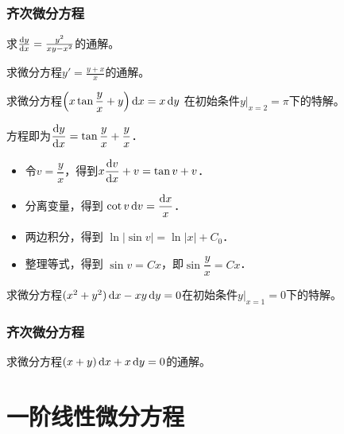 \documentclass[14pt,notheorems,leqno,xcolor={rgb}]{beamer} %
\begin{document}
\begin{frame}
\frametitle{齐次微分方程}
\begin{example}求$\frac{\mathop{}\!\mathrm{d}{y}}{\mathop{}\!\mathrm{d}{x}}=\frac{y^2}{xy-x^2}$的通解。
\end{example}
\pause
\begin{exercise}
求微分方程$y'=\frac{y+x}x$的通解。
\end{exercise}
\end{frame}

\begin{frame}%
\begin{example}求微分方程$\Big(x\tan\dfrac{y}{x}+y\Big)\mathop{}\!\mathrm{d}{x}=x\mathop{}\!\mathrm{d}{y}$
在初始条件$y|_{x=2}=\pi$下的特解。
\end{example}
\pause\vspace{-0.3em}
\begin{solution}
方程即为$\dfrac{\mathop{}\!\mathrm{d} y}{\mathop{}\!\mathrm{d} x}=\tan\dfrac{y}{x}+\dfrac{y}{x}$．\pause\vspace{-0.6em}
\begin{itemize}[<+->]
  \item 令$v=\dfrac{y}{x}$，得到$x\dfrac{\mathop{}\!\mathrm{d} v}{\mathop{}\!\mathrm{d} x} + v = \tan v + v$．\vspace{-0.3em}
  \item 分离变量，得到 $\cot v\mathop{}\!\mathrm{d} v = \dfrac{\mathop{}\!\mathrm{d} x}{x}$．
  \item 两边积分，得到 $\ln|\sin v|=\ln|x|+C_0$．
  \item 整理等式，得到 $\sin v=Cx$，即$\sin\dfrac{y}{x}=Cx$．
\end{itemize}%
\vspace{-0.6em}
\end{solution}
\end{frame}

\begin{frame}
\begin{exercise}
求微分方程$(x^2+y^2)\mathop{}\!\mathrm{d}{x}-xy\mathop{}\!\mathrm{d}{y}=0$在初始条件$y|_{x=1}=0$下的特解。
\end{exercise}
\end{frame}

\begin{frame}
\frametitle{齐次微分方程}
\begin{review}
求微分方程$(x+y)\mathop{}\!\mathrm{d} x+x\mathop{}\!\mathrm{d} y=0$的通解。
\end{review}
\end{frame}

\section{一阶线性微分方程}
\end{document}
